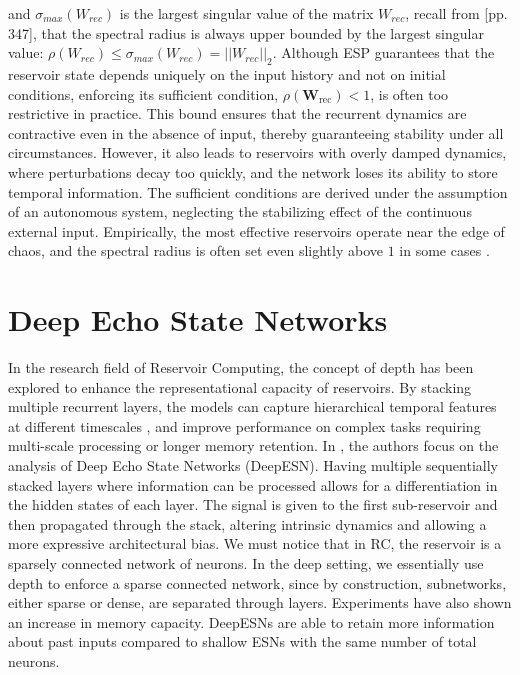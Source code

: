 and $\sigma_{max}(W_{rec})$ is the largest singular value of the matrix $W_{rec}$, recall from \cite{0521386322}[pp. 347], that
the spectral radius is always upper bounded by the largest singular value: $\rho(W_{rec}) \leq \sigma_{max}(W_{rec}) = ||W_{rec}||_2$.
\newline
Although ESP guarantees that the reservoir state depends uniquely on the input history and not on initial conditions, enforcing its sufficient condition,
$\rho(\mathbf{W}_{\text{rec}}) < 1$, is often too restrictive in practice.
This bound ensures that the recurrent dynamics are contractive even in the absence of input, thereby guaranteeing stability under all circumstances. 
However, it also leads to reservoirs with overly damped dynamics, where perturbations decay too quickly, and the network loses its ability to store temporal information.
The sufficient conditions are derived under the assumption of an autonomous system, neglecting the stabilizing effect of the continuous external input.
Empirically, the most effective reservoirs operate near the edge of chaos, and the spectral radius is often set even slightly above $1$ in some cases \cite{cucchi2022hands}.

\section{Deep Echo State Networks}
In the research field of Reservoir Computing, the concept of depth has been explored to enhance the representational capacity of reservoirs.
By stacking multiple recurrent layers, the models can capture hierarchical temporal features at different timescales \cite{pascanu2014constructdeeprecurrentneural},
and improve performance on complex tasks requiring multi-scale processing or longer memory retention.
\newline
In \cite{GALLICCHIO201787} \cite{gallicchio2017echo}, the authors focus on the analysis of Deep Echo State Networks (DeepESN). 
Having multiple sequentially stacked layers where information can be processed allows for a differentiation in the hidden states of each layer. The signal is given to the first sub-reservoir and then
propagated through the stack, altering intrinsic dynamics and allowing a more expressive architectural bias. We must notice that in RC, the reservoir is a sparsely connected network of neurons. In the deep setting, we essentially use depth to enforce a sparse connected network, since by construction, subnetworks, either sparse or dense, are separated through layers.
Experiments have also shown an increase in memory capacity. DeepESNs are able to retain more information about past inputs compared to shallow ESNs with the same number of total neurons.

